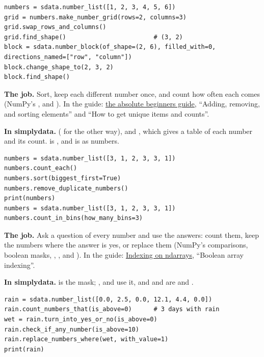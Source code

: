 \begin{lstlisting}[style=py]
numbers = sdata.number_list([1, 2, 3, 4, 5, 6])
grid = numbers.make_number_grid(rows=2, columns=3)
grid.swap_rows_and_columns()
grid.find_shape()                        # (3, 2)
block = sdata.number_block(of_shape=(2, 6), filled_with=0, directions_named=["row", "column"])
block.change_shape_to(2, 3, 2)
block.find_shape()
\end{lstlisting}


\textbf{The job.} Sort, keep each different number once, and count how often each comes (NumPy's
,  and ). In the guide:
\href{https://numpy.org/doc/stable/user/absolute_beginners.html}{the absolute beginners guide},
``Adding, removing, and sorting elements'' and ``How to get unique items and counts''.

\textbf{In simplydata.}  ( for the other way),
 and , which gives a table of each number and its
count.  is , and  is
 as numbers.

\begin{lstlisting}[style=py]
numbers = sdata.number_list([3, 1, 2, 3, 3, 1])
numbers.count_each()
numbers.sort(biggest_first=True)
numbers.remove_duplicate_numbers()
print(numbers)
numbers = sdata.number_list([3, 1, 2, 3, 3, 1])
numbers.count_in_bins(how_many_bins=3)
\end{lstlisting}


\textbf{The job.} Ask a question of every number and use the answers: count them, keep the numbers
where the answer is yes, or replace them (NumPy's comparisons, boolean masks, ,
,  and ). In the guide:
\href{https://numpy.org/doc/stable/user/basics.indexing.html}{Indexing on ndarrays}, ``Boolean array
indexing''.

\textbf{In simplydata.}  is the mask;
,  and  use it, and
 and  are  and .

\begin{lstlisting}[style=py]
rain = sdata.number_list([0.0, 2.5, 0.0, 12.1, 4.4, 0.0])
rain.count_numbers_that(is_above=0)      # 3 days with rain
wet = rain.turn_into_yes_or_no(is_above=0)
rain.check_if_any_number(is_above=10)
rain.replace_numbers_where(wet, with_value=1)
print(rain)
\end{lstlisting}

